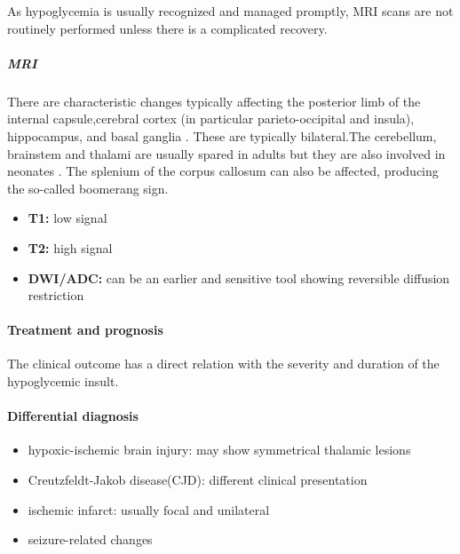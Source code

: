 As hypoglycemia is usually recognized and managed promptly, MRI scans are not routinely performed unless there is a complicated recovery.

\subparagraph{MRI}

There are characteristic changes typically affecting the posterior limb of the internal capsule,cerebral cortex (in particular parieto-occipital and insula), hippocampus, and basal ganglia . These are typically bilateral.The cerebellum, brainstem and thalami are usually spared in adults but they are also involved in neonates . The splenium of the corpus callosum can also be affected, producing the so-called boomerang sign.

\begin{itemize}
	\item
	\textbf{T1:} low signal
	\item
	\textbf{T2:} high signal
	\item
	\textbf{DWI/ADC:} can be an earlier and sensitive tool showing reversible diffusion restriction 
\end{itemize}


\paragraph{Treatment and prognosis}

The clinical outcome has a direct relation with the severity and duration of the hypoglycemic insult.


\paragraph{Differential diagnosis}

\begin{itemize}
	\item
	hypoxic-ischemic brain injury: may show symmetrical thalamic lesions 
	\item
	Creutzfeldt-Jakob disease(CJD): different clinical presentation
	\item
	ischemic infarct: usually focal and unilateral
	\item
	seizure-related changes
\end{itemize}